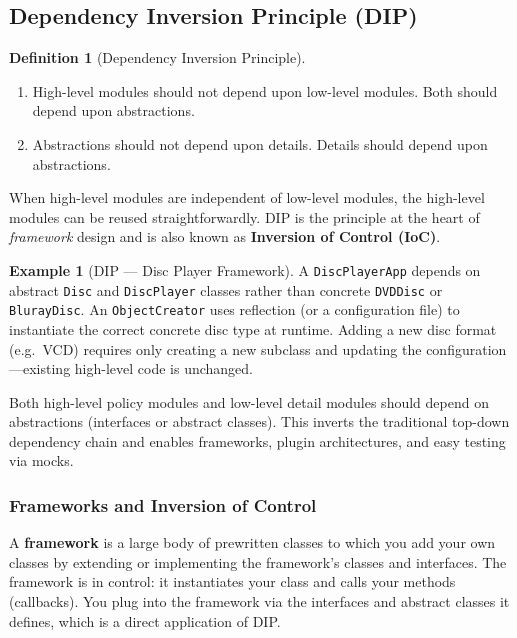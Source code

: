 \documentclass[11pt, a4paper, notitlepage]{report}
\theoremstyle{definition}
\newtheorem{definition}[theorem]{Definition}
\theoremstyle{remark}
\theoremstyle{definition}
\newtheorem{example}[theorem]{Example}
\begin{document}
\subsection{Dependency Inversion Principle (DIP)}
\label{subsec:ch9-dip}

\begin{definition}[Dependency Inversion Principle]
\label{def:ch9-dip}
\leavevmode
\begin{enumerate}[label=\Alph*.]
  \item High-level modules should not depend upon low-level modules. Both should
        depend upon abstractions.
  \item Abstractions should not depend upon details. Details should depend upon
        abstractions.
\end{enumerate}
\end{definition}

When high-level modules are independent of low-level modules, the high-level modules can
be reused straightforwardly. DIP is the principle at the heart of \emph{framework} design
and is also known as \textbf{Inversion of Control (IoC)}.

\begin{example}[DIP --- Disc Player Framework]
\label{ex:ch9-dip-disc}
A \texttt{DiscPlayerApp} depends on abstract \texttt{Disc} and \texttt{DiscPlayer}
classes rather than concrete \texttt{DVDDisc} or \texttt{BlurayDisc}. An
\texttt{ObjectCreator} uses reflection (or a configuration file) to instantiate the
correct concrete disc type at runtime. Adding a new disc format (e.g.\ VCD) requires
only creating a new subclass and updating the configuration---existing high-level
code is unchanged.
\end{example}

\begin{keyresult}[title={Key Result: Depend on Abstractions}]
  Both high-level policy modules and low-level detail modules should depend on
  abstractions (interfaces or abstract classes). This inverts the traditional
  top-down dependency chain and enables frameworks, plugin architectures, and
  easy testing via mocks.
\end{keyresult}

\subsubsection{Frameworks and Inversion of Control}

A \textbf{framework} is a large body of prewritten classes to which you add your own
classes by extending or implementing the framework's classes and interfaces. The
framework is in control: it instantiates your class and calls your methods (callbacks).
You plug into the framework via the interfaces and abstract classes it defines, which
is a direct application of DIP.
\end{document}

